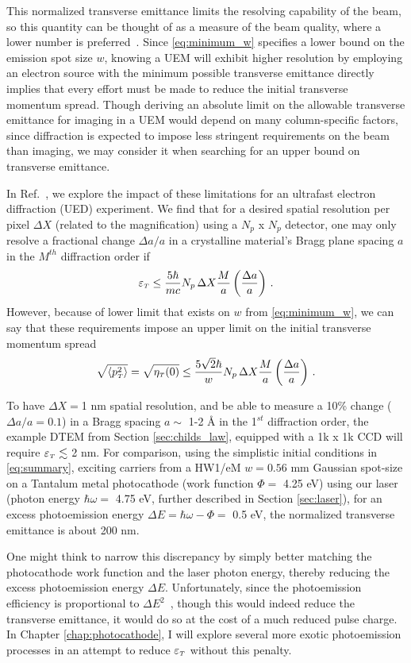 This normalized transverse emittance limits the resolving capability of the beam, so this quantity can be thought of as a measure of the beam quality, where a lower number is preferred~\cite{berger_dc_2009}.
Since \ref{eq:minimum_w} specifies a lower bound on the emission spot size $w$, knowing a UEM will exhibit higher resolution by employing an electron source with the minimum possible transverse emittance directly implies that every effort must be made to reduce the initial transverse momentum spread.
Though deriving an absolute limit on the allowable transverse emittance for imaging in a UEM would depend on many column-specific factors, since diffraction is expected to impose less stringent requirements on the beam than imaging, we may consider it when searching for an upper bound on transverse emittance.

In Ref.~\cite{berger_dc_2009}, we explore the impact of these limitations for an ultrafast electron diffraction (UED) experiment.
We find that for a desired spatial resolution per pixel $\Delta X$ (related to the magnification) using a $N_p$ x $N_p$ detector, one may only resolve a fractional change $\Delta a / a$ in a crystalline material's Bragg plane spacing $a$ in the $M^{th}$ diffraction order if
\begin{equation}
  \varepsilon_{{\scriptscriptstyle T}} \le \frac{5 \hbar}{m c} N_p \, \Delta X \frac{M}{a} \left ( \frac{\Delta a}{a} \right ) \,\text{.}
\end{equation}
However, because of lower limit that exists on $w$ from \ref{eq:minimum_w}, we can say that these requirements impose an upper limit on the initial transverse momentum spread
\begin{equation}
  \sqrt{ \left < p_{{\scriptscriptstyle T}}^2 \right > } = \sqrt{ \eta_{{\scriptscriptstyle T}} (0) } \le \frac{5\sqrt{2} \hbar}{w} N_p \, \Delta X \frac{M}{a} \left ( \frac{\Delta a}{a} \right ) \,\text{.}
\end{equation}

To have $\Delta X = $1 nm spatial resolution, and be able to measure a 10\% change ($\Delta a / a = 0.1$) in a Bragg spacing $a \sim$ 1-2 \AA{} in the 1$^{st}$ diffraction order, the example DTEM from Section \ref{sec:childs_law}, equipped with a 1k x 1k CCD will require $\varepsilon_{{\scriptscriptstyle T}} \lesssim$ 2 nm.
For comparison, using the simplistic initial conditions in \ref{eq:summary}, exciting carriers from a HW1/eM $w = 0.56 \text{ mm}$ Gaussian spot-size on a Tantalum metal photocathode (work function $\Phi =$ 4.25 eV) using our laser (photon energy $\hbar \omega =$ 4.75 eV, further described in Section \ref{sec:laser}), for an excess photoemission energy $\Delta E = \hbar \omega - \Phi =$ 0.5 eV, the normalized transverse emittance is about 200 nm.

One might think to narrow this discrepancy by simply better matching the photocathode work function and the laser photon energy, thereby reducing the excess photoemission energy $\Delta E$.
Unfortunately, since the photoemission efficiency is proportional to $\Delta E^2$~\cite{shalaev_electron_1994}, though this would indeed reduce the transverse emittance, it would do so at the cost of a much reduced pulse charge.
In Chapter \ref{chap:photocathode}, I will explore several more exotic photoemission processes in an attempt to reduce $\varepsilon_{{\scriptscriptstyle T}}$ without this penalty.
